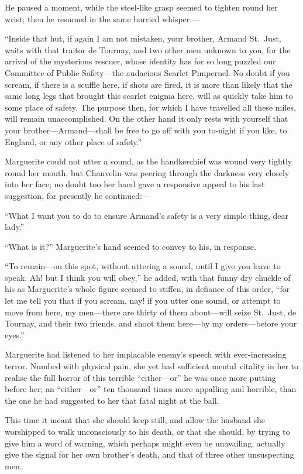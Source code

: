 \documentclass[paper=a5,BCOR=7mm,twoside,DIV=calc,12pt,usegeometry,chapterprefix,endperiod,headings=big]{scrbook}
\begin{document}
He paused a moment, while the steel-like grasp seemed to tighten round her wrist; then he resumed in the same hurried whisper:---

\enquote{Inside that hut, if again I am not mistaken, your brother, Armand St.~Just, waits with that traitor de Tournay, and two other men unknown to you, for the arrival of the mysterious rescuer, whose identity has for so long puzzled our Committee of Public Safety---the audacious Scarlet Pimpernel. No doubt if you scream, if there is a scuffle here, if shots are fired, it is more than likely that the same long legs that brought this scarlet enigma here, will as quickly take him to some place of safety. The purpose then, for which I have travelled all these miles, will remain unaccomplished. On the other hand it only rests with yourself that your brother---Armand---shall be free to go off with you to-night if you like, to England, or any other place of safety.}

Marguerite could not utter a sound, as the handkerchief was wound very tightly round her mouth, but Chauvelin was peering through the darkness very closely into her face; no doubt too her hand gave a responsive appeal to his last suggestion, for presently he continued:---

\enquote{What I want you to do to ensure Armand's safety is a very simple thing, dear lady.}

\enquote{What is it?} Marguerite's hand seemed to convey to his, in response.

\enquote{To remain---on this spot, without uttering a sound, until I give you leave to speak. Ah! but I think you will obey,} he added, with that funny dry chuckle of his as Marguerite's whole figure seemed to stiffen, in defiance of this order, \enquote{for let me tell you that if you scream, nay! if you utter one sound, or attempt to move from here, my men---there are thirty of them about---will seize St.~Just, de Tournay, and their two friends, and shoot them here---by my orders---before your eyes.}

Marguerite had listened to her implacable enemy's speech with ever-increasing terror. Numbed with physical pain, she yet had sufficient mental vitality in her to realise the full horror of this terrible \enquote{either---or} he was once more putting before her; an \enquote{either---or} ten thousand times more appalling and horrible, than the one he had suggested to her that fatal night at the ball.

This time it meant that she should keep still, and allow the husband she worshipped to walk unconsciously to his death, or that she should, by trying to give him a word of warning, which perhaps might even be unavailing, actually give the signal for her own brother's death, and that of three other unsuspecting men.
\end{document}
